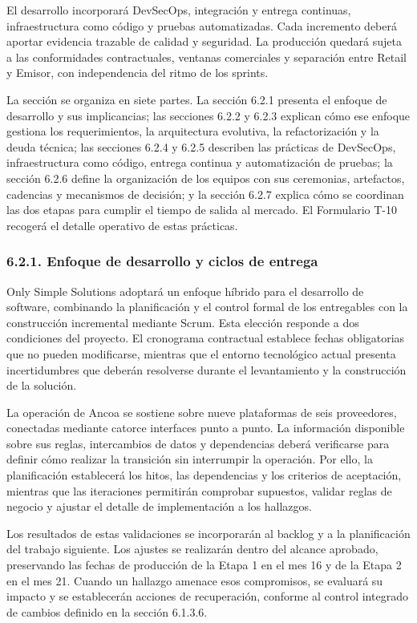 \documentclass[11pt]{article}
\begin{document}
El desarrollo incorporará DevSecOps, integración y entrega continuas,
infraestructura como código y pruebas automatizadas. Cada incremento
deberá aportar evidencia trazable de calidad y seguridad. La producción
quedará sujeta a las conformidades contractuales, ventanas comerciales y
separación entre Retail y Emisor, con independencia del ritmo de los
sprints.

La sección se organiza en siete partes. La sección 6.2.1 presenta el
enfoque de desarrollo y sus implicancias; las secciones 6.2.2 y 6.2.3
explican cómo ese enfoque gestiona los requerimientos, la arquitectura
evolutiva, la refactorización y la deuda técnica; las secciones 6.2.4 y
6.2.5 describen las prácticas de DevSecOps, infraestructura como código,
entrega continua y automatización de pruebas; la sección 6.2.6 define la
organización de los equipos con sus ceremonias, artefactos, cadencias y
mecanismos de decisión; y la sección 6.2.7 explica cómo se coordinan las
dos etapas para cumplir el tiempo de salida al mercado. El Formulario
T-10 recogerá el detalle operativo de estas prácticas.

\subsubsection{6.2.1. Enfoque de desarrollo y ciclos de entrega}\label{6-2-1-enfoque-de-desarrollo-y-ciclos-de-entrega}

Only Simple Solutions adoptará un enfoque híbrido para el desarrollo de software, combinando la planificación y el control formal de los entregables con la construcción incremental mediante Scrum. Esta elección responde a dos condiciones del proyecto. El cronograma contractual establece fechas obligatorias que no pueden modificarse, mientras que el entorno tecnológico actual presenta incertidumbres que deberán resolverse durante el levantamiento y la construcción de la solución.

La operación de Ancoa se sostiene sobre nueve plataformas de seis
proveedores, conectadas mediante catorce interfaces punto a punto. La
información disponible sobre sus reglas, intercambios de datos y
dependencias deberá verificarse para definir cómo realizar la transición
sin interrumpir la operación. Por ello, la planificación establecerá los
hitos, las dependencias y los criterios de aceptación, mientras que las
iteraciones permitirán comprobar supuestos, validar reglas de negocio y
ajustar el detalle de implementación a los hallazgos.

Los resultados de estas validaciones se incorporarán al backlog y a la
planificación del trabajo siguiente. Los ajustes se realizarán dentro
del alcance aprobado, preservando las fechas de producción de la Etapa 1
en el mes 16 y de la Etapa 2 en el mes 21. Cuando un hallazgo amenace
esos compromisos, se evaluará su impacto y se establecerán acciones de
recuperación, conforme al control integrado de cambios definido en la
sección 6.1.3.6.
\end{document}
